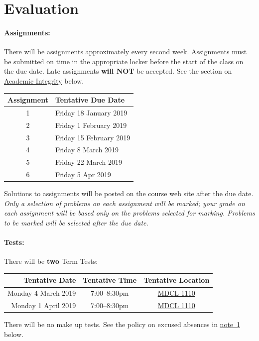 \documentclass[12pt]{article}
\newcommand{\note}{\noindent{\bfseries\slshape Note:\/} }
\begin{document}
\section*{Evaluation}

\paragraph*{Assignments:} There will be assignments approximately every second week.  Assignments must be submitted on time in the appropriate locker before the start of the class on the due date.  Late assignments {\bf will NOT} be accepted.  See the section on \hyperlink{dishonesty}{Academic Integrity} below.
%
\begin{center}
\begin{tabular}{c|l}
\bf Assignment & \bf Tentative Due Date \\\hline
1 & Friday 18 January 2019 \\
2 & Friday  1 February 2019 \\
3 & Friday 15 February 2019 \\
4 & Friday  8 March 2019 \\
5 & Friday 22 March 2019 \\
6 & Friday  5 Apr 2019
\end{tabular}
\end{center}
%
Solutions to assignments will be posted on the course web site after the due date.
\note \emph{Only a selection of problems on each assignment will be marked; your grade on each assignment will be based only on the problems selected for marking.  Problems to be marked will be selected after the due date.}



\paragraph*{Tests:}

There will be {\bf two} Term Tests:
\begin{center}
\begin{tabular}{r|c|c}
\bf Tentative Date & \bf Tentative Time & \bf Tentative Location \\\hline
Monday 4 March 2019 & 7:00--8:30pm & \href{http://library.mcmaster.ca/cct/class-dir/mdcl-1110}{MDCL 1110}\\
Monday 1 April 2019 & 7:00--8:30pm & \href{http://library.mcmaster.ca/cct/class-dir/mdcl-1110}{MDCL 1110}
\end{tabular}
\end{center}
\noindent
There will be no make up tests. See the policy on excused absences in \hyperlink{note1}{note~1} below.
\end{document}
